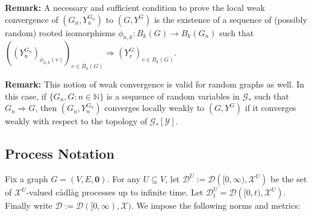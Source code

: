 \documentclass[12pt]{article}
\newcommand{\skipLine}{\vspace{12pt}}
\newcommand{\mb}{\mathbb}
\newcommand{\mc}{\mathcal}
\newcommand{\ra}{\rightarrow}
\newcommand{\remark}{\textbf{Remark: }}
\newcommand{\defeq}{:=}								%
\newcommand{\cad}{\mc{D}}							%
\newcommand{\sta}{\mc{X}}							%
\renewcommand{\root}{\mathbf{0}}					%
\newcommand{\vind}[1]{_{#1}}						%
\newcommand{\gind}[1]{^{#1}}						%
\newcommand{\vpara}[1]{^{#1}}						%
\newcommand{\tpara}[1]{_{#1}}						%
\newcommand{\Gs}{\mc{G}_\ast}						%
\newcommand{\trnc}[1]{B_{#1}}						%
\newcommand{\spce}{\mc{Y}}							%
\renewcommand{\sp}[1]{[#1]}							%
\newcommand{\Xg}{Y}									%
\renewcommand{\it}[1]{_{#1}}						%
\begin{document}
\remark A necessary and sufficient condition to prove the local weak convergence of \((G\it{n},\Xg\gind{G\it{n}}\it{n})\) to \((G,\Xg\gind{G})\) is the existence of a sequence of (possibly random) rooted isomorphisms \(\phi_{n,k}: \trnc{k}(G) \ra \trnc{k}(G\it{n})\) such that \(\left((\Xg\gind{G\it{n}}\it{n})\vind{\phi_{n,k}(v)}\right)_{v\in \trnc{k}(G)} \Rightarrow \left(\Xg\gind{G}\vind{v}\right)_{v \in\trnc{k}(G)}\).

\skipLine

\remark This notion of weak convergence is valid for random graphs as well. In this case, if \(\{G\it{n},G:n\in\mb{N}\}\) is a sequence of random variables in \(\Gs\) such that \(G\it{n}\Rightarrow G\), then \((G\it{n},\Xg\gind{G\it{n}}\it{n})\) converges locally weakly to \((G,\Xg\gind{G})\) if it converges weakly with respect to the topology of \(\Gs\sp{\spce}\).

\subsection{Process Notation}
\label{not::p}

Fix a graph \(G = (V,E,\root)\). For any \(U \subseteq V\), let \(\cad\vpara{U} := \cad\left([0,\infty),\sta^U\right)\) be the set of \(\sta^U\)-valued c\`adl\`ag processes up to infinite time. Let \(\cad\vpara{U}\tpara{t} = \cad\left([0,t),\sta^U\right)\). Finally write \(\cad \defeq \cad([0,\infty),\sta)\). We impose the following norms and metrics:
\end{document}
